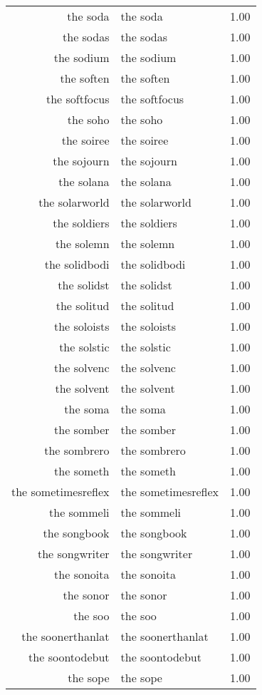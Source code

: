 \begin{table}[ht]
\begin{tabular}{rlr}
  the soda & the soda & 1.00 \\ 
  the sodas & the sodas & 1.00 \\ 
  the sodium & the sodium & 1.00 \\ 
  the soften & the soften & 1.00 \\ 
  the softfocus & the softfocus & 1.00 \\ 
  the soho & the soho & 1.00 \\ 
  the soiree & the soiree & 1.00 \\ 
  the sojourn & the sojourn & 1.00 \\ 
  the solana & the solana & 1.00 \\ 
  the solarworld & the solarworld & 1.00 \\ 
  the soldiers & the soldiers & 1.00 \\ 
  the solemn & the solemn & 1.00 \\ 
  the solidbodi & the solidbodi & 1.00 \\ 
  the solidst & the solidst & 1.00 \\ 
  the solitud & the solitud & 1.00 \\ 
  the soloists & the soloists & 1.00 \\ 
  the solstic & the solstic & 1.00 \\ 
  the solvenc & the solvenc & 1.00 \\ 
  the solvent & the solvent & 1.00 \\ 
  the soma & the soma & 1.00 \\ 
  the somber & the somber & 1.00 \\ 
  the sombrero & the sombrero & 1.00 \\ 
  the someth & the someth & 1.00 \\ 
  the sometimesreflex & the sometimesreflex & 1.00 \\ 
  the sommeli & the sommeli & 1.00 \\ 
  the songbook & the songbook & 1.00 \\ 
  the songwriter & the songwriter & 1.00 \\ 
  the sonoita & the sonoita & 1.00 \\ 
  the sonor & the sonor & 1.00 \\ 
  the soo & the soo & 1.00 \\ 
  the soonerthanlat & the soonerthanlat & 1.00 \\ 
  the soontodebut & the soontodebut & 1.00 \\ 
  the sope & the sope & 1.00 \\ 

\end{tabular}
\end{table}

